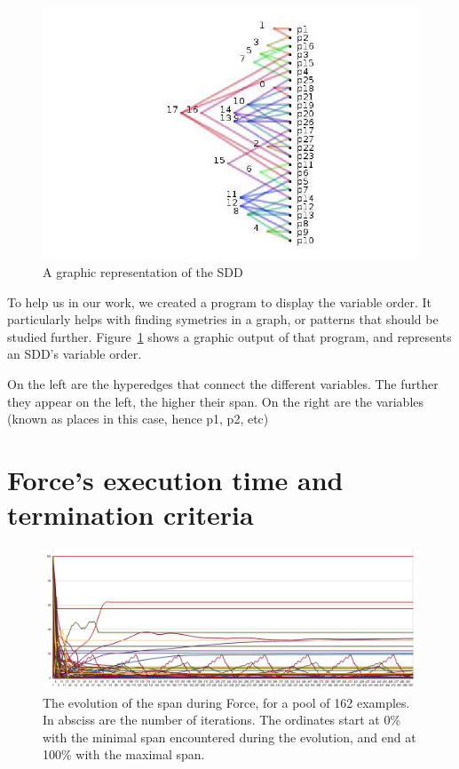 \documentclass[12pt]{report}
\begin{document}
\begin{figure}[!h]
  \centering
  \includegraphics[scale=0.5]{images/representation_order.jpg}
  \caption{A graphic representation of the SDD}
  \label{order_graph}
\end{figure}

To help us in our work, we created a program to display the variable order. It particularly helps with finding symetries in a graph, or patterns that should be studied further. Figure~\ref{order_graph} shows a graphic output of that program, and represents an SDD's variable order.

On the left are the hyperedges that connect the different variables. The further they appear on the left, the higher their span. On the right are the variables (known as places in this case, hence p1, p2, etc)

\section{Force's execution time and termination criteria}

\begin{figure}[H]
  \begin{center}
  \includegraphics[width=1\textwidth]{images/force_plot.png}
  \end{center}
  \caption{The evolution of the span during Force, for a pool of 162 examples. In absciss are the number of iterations. The ordinates start at 0\% with the minimal span encountered during the evolution, and end at 100\% with the maximal span.}
  \label{force_plot}
\end{figure}
\end{document}
